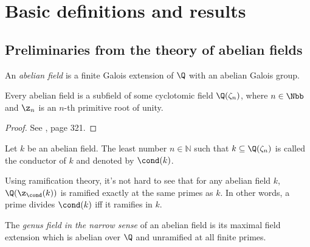 \chapter{Basic definitions and results}
\setcounter{page}{1}

\section{Preliminaries from the theory of abelian fields}
\begin{definition}
An \textit{abelian field} is a finite Galois extension of $\Q$ with an abelian Galois group. 
\end{definition}

\begin{theorem}
Every abelian field is a subfield of some cyclotomic field $\Q(\zeta_n)$, where $n\in \Nbb$ and $\z_n$ is an $n$-th primitive root of unity.
\end{theorem}
\begin{proof}
See \citep{washington1997}, page 321.
\end{proof}

\begin{definition}
Let $k$ be an abelian field. The least number $n\in\mathbb{N}$ such that $k\subseteq \Q(\zeta_n)$ is called the conductor of $k$ and denoted by $\cond(k)$.
\end{definition}

\begin{rem}\label{ramif}
Using ramification theory, it's not hard to see that for any abelian field $k$, $\Q(\z_\cond(k))$ is ramified exactly at the same primes as $k$. In other words, a prime divides $\cond(k)$ iff it ramifies in $k$.
\end{rem}

\begin{definition}\label{genusdef}
The \textit{genus field in the narrow sense} of an abelian field is its maximal field extension which is abelian over $\Q$ and unramified at all finite primes.
\end{definition}

